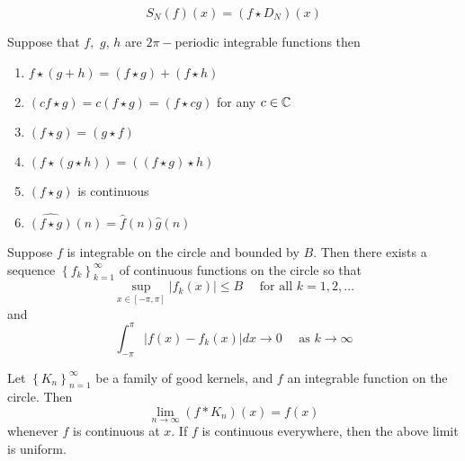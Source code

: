 \begin{theorem}
$$S_N(f)(x)=(f\star D_N)(x)$$
\end{theorem}


\begin{theorem}
Suppose that $f,$ $g$, $h$ are $2\pi-$periodic integrable functions then \begin{enumerate}[label=(\roman*)]
    \item $f\star (g + h)=(f\star g) + (f\star h)$
    \item $(cf\star g)=c(f\star g)=(f\star cg)$ for any $c\in \mathbb{C}$
    \item $(f\star g)=(g\star f)$
    \item $(f\star (g\star h))= ((f\star g)\star h)$
    \item $(f\star g)$ is continuous 
    \item $\hat{(f \star g)} (n)=\hat{f}(n)\hat{g}(n)$
\end{enumerate}
\end{theorem}
\begin{theorem}
Suppose $f$ is integrable on the circle and bounded by $B$. Then there exists a sequence $\left\{f_k\right\}_{k=1}^{\infty}$ of continuous functions on the circle so that
$$
\sup _{x \in[-\pi, \pi]}\left|f_k(x)\right| \leq B \quad \text { for all } k=1,2, \ldots
$$
and
$$
\int_{-\pi}^\pi\left|f(x)-f_k(x)\right| d x \rightarrow 0 \quad \text { as } k \rightarrow \infty
$$
\end{theorem}
\begin{theorem}\label{apptoiden}
Let $\left\{K_n\right\}_{n=1}^{\infty}$ be a family of good kernels, and $f$ an integrable function on the circle. Then
$$
\lim _{n \rightarrow \infty}\left(f * K_n\right)(x)=f(x)
$$
whenever $f$ is continuous at $x$. If $f$ is continuous everywhere, then the above limit is uniform.
\end{theorem}
